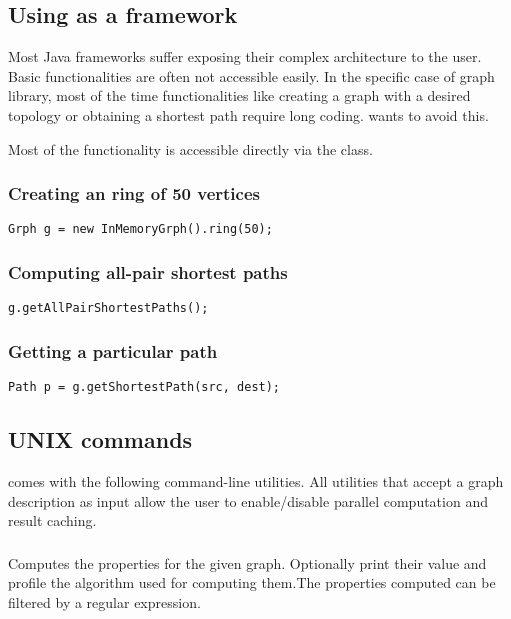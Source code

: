 \documentclass{article}
\begin{document}
\subsection{Using \grph as a framework}

Most Java frameworks suffer exposing their complex architecture to the user. Basic functionalities are often not accessible easily.
In the specific case of graph library, most of the time functionalities like creating a graph with a desired topology or obtaining
a shortest path require long coding. \grph wants to avoid this.

Most of the \grph functionality is accessible directly via the  class.


\subsubsection{Creating an ring of 50 vertices}

\begin{lstlisting}
Grph g = new InMemoryGrph().ring(50);
\end{lstlisting}

\subsubsection{Computing all-pair shortest paths}

\begin{lstlisting}
g.getAllPairShortestPaths();
\end{lstlisting}

\subsubsection{Getting a particular path}

\begin{lstlisting}
Path p = g.getShortestPath(src, dest);
\end{lstlisting}


\subsection{\grph UNIX commands}

\grph comes with the following command-line utilities.
All utilities that accept a graph description as input allow the user to enable/disable parallel computation and result caching.

\subsubsection{}
Computes the properties for the given graph. Optionally print their value and profile the algorithm used for computing them.The properties computed can be filtered by a regular expression.
\end{document}
